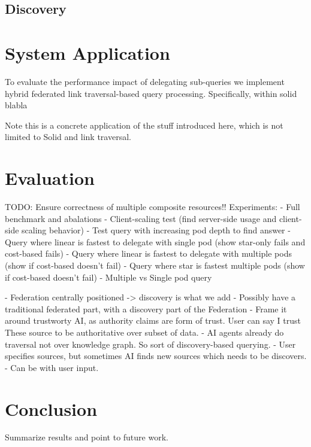 \documentclass[sigconf,review,anonymous]{acmart}
\theoremstyle{plain}
\theoremstyle{definition}
\theoremstyle{remark}
\begin{document}
\subsection{Discovery}

\section{System Application}
To evaluate the performance impact of delegating sub-queries we implement 
hybrid federated link traversal-based query processing. Specifically, within solid blabla

Note this is a concrete application of the stuff introduced here, which is not limited to Solid
and link traversal.



\section{Evaluation}
TODO: Ensure correctness of multiple composite resources!!
Experiments: 
- Full benchmark and abalations
- Client-scaling test (find server-side usage and client-side scaling behavior)
- Test query with increasing pod depth to find answer
- Query where linear is fastest to delegate with single pod 
(show star-only fails and cost-based fails)
- Query where linear is fastest to delegate with multiple pods (show if cost-based doesn't fail)
- Query where star is fastest multiple pods (show if cost-based doesn't fail)
- Multiple vs Single pod query


- Federation centrally positioned -> discovery is what we add 
- Possibly have a traditional federated part, with a discovery part of the Federation
- Frame it around trustworty AI, as authority claims are form of trust. User can say I trust These
source to be authoritative over subset of data.
- AI agents already do traversal not over knowledge graph. So sort of discovery-based querying.
- User specifies sources, but sometimes AI finds new sources which needs to be discovers. 
- Can be with user input.


\section{Conclusion}
Summarize results and point to future work.



\end{document}
